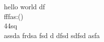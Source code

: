 \documentclass{article}
\begin{document}
	hello world df \textbf{\gitRel}\\
	fffas:\gitRoff(\gitCommitterDate)\\
	44sq
	\\
	assda
	frdsa fsd d dfsd sdfsd
	asfa
\end{document}
